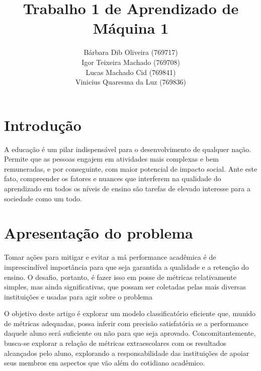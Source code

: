 \documentclass[]{IEEEphot}
\begin{document}
\title{Trabalho 1 de Aprendizado de Máquina 1}

\author{Bárbara Dib Oliveira (769717) \\
  Igor Teixeira Machado (769708) \\
  Lucas Machado Cid (769841) \\
  Vinicius Quaresma da Luz (769836)}


\maketitle




\section{Introdução}

A educação é um pilar indispensável para o desenvolvimento de qualquer nação. Permite que as pessoas engajem em atividades mais complexas e bem remuneradas, e por conseguinte, com maior potencial de impacto social. Ante este fato, compreender os fatores e nuances que interferem na qualidade do aprendizado em todos os níveis de ensino são tarefas de elevado interesse para a sociedade como um todo.

\section{Apresentação do problema}

Tomar ações para mitigar e evitar a má performance acadêmica é de imprescindível importância para que seja garantida a qualidade e a retenção do ensino. O desafio, portanto, é fazer isso em posse de métricas relativamente simples, mas ainda significativas, que possam ser coletadas pelas mais diversas instituições e usadas para agir sobre o problema

O objetivo deste artigo é explorar um modelo classificatório eficiente que, munido de métricas adequadas, possa inferir com precisão satisfatória se a performance daquele aluno será suficiente ou não para que seja aprovado. Concomitantemente, busca-se explorar a relação de métricas extraescolares com os resultados alcançados pelo aluno, explorando a responsabilidade das instituições de apoiar seus membros em aspectos que vão além do cotidiano acadêmico.
\end{document}
